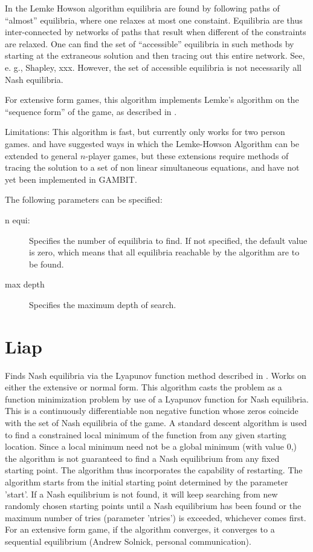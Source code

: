 In the Lemke Howson algorithm equilibria are found by following paths of
``almost'' equilibria, where one relaxes at most one constaint.
Equilibria are thus inter-connected by networks of paths that result when
different of the constraints are relaxed.  One can find the set of
``accessible''  equilibria in such methods by starting at the extraneous
solution and then tracing out this entire network.  See, e. g., Shapley,
xxx.  However, the set of accessible equilibria is not necessarily all
Nash equilibria.

For extensive form games, this algorithm implements Lemke's algorithm on
the ``sequence form'' of the game, as described in \cite{KolMegSte:94}.

Limitations:  This algorithm is fast, but currently only works for two
person games.  \cite{Wilson:1971} and \cite{Rosenmuller:1971} have
suggested ways in which the Lemke-Howson Algorithm can be extended to
general $n$-player games, but these extensions require methods of tracing
the solution to a set of non linear simultaneous equations, and have not
yet been implemented in GAMBIT.

The following parameters can be specified:

\begin{description}
\item[n equi:] Specifies the number of equilibria to find.  If not specified,
the default value is zero, which means that all equilibria reachable by
the algorithm are to be found.
\item[max depth]
Specifies the maximum depth of search.
\end{description}

\section{Liap}
Finds Nash equilibria via the Lyapunov function method
described in \cite{McK:91}.  Works on either the extensive or normal
form.  This algorithm casts the problem as a function minimization
problem by use of a Lyapunov function for Nash equilibria.  This is a
continuously differentiable non negative function whose zeros coincide
with the set of Nash equilibria of the game.  A standard descent
algorithm is used to find a constrained local minimum of the function
from any given starting location.  Since a local minimum need not be a
global minimum (with value 0,) the algorithm is not guaranteed to find
a Nash equilibrium from any fixed starting point.  The algorithm thus
incorporates the capability of restarting.  The algorithm starts from
the initial starting point determined by the parameter 'start'.  If a
Nash equilibrium is not found, it will keep searching from new
randomly chosen starting points until a Nash equilibrium has been
found or the maximum number of tries (parameter 'ntries') is exceeded,
whichever comes first.  For an extensive form game, if the algorithm
converges, it converges to a sequential equilibrium (Andrew Solnick,
personal communication).

